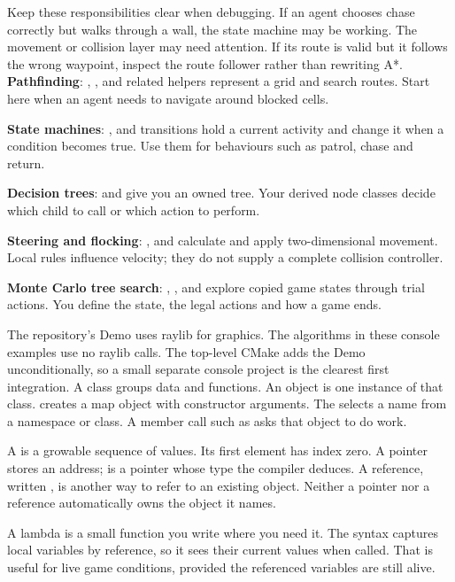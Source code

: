 \documentclass[11pt,a4paper]{article}
\begin{document}
Keep these responsibilities clear when debugging. If an agent chooses chase correctly but walks through a wall, the state machine may be working. The movement or collision layer may need attention. If its route is valid but it follows the wrong waypoint, inspect the route follower rather than rewriting A*.
\textbf{Pathfinding}: , ,  and related helpers represent a grid and search routes. Start here when an agent needs to navigate around blocked cells.

\textbf{State machines}: ,  and transitions hold a current activity and change it when a condition becomes true. Use them for behaviours such as patrol, chase and return.

\textbf{Decision trees}:  and  give you an owned tree. Your derived node classes decide which child to call or which action to perform.

\textbf{Steering and flocking}: ,  and  calculate and apply two-dimensional movement. Local rules influence velocity; they do not supply a complete collision controller.

\textbf{Monte Carlo tree search}: , ,  and  explore copied game states through trial actions. You define the state, the legal actions and how a game ends.

The repository's Demo uses raylib for graphics. The algorithms in these console examples use no raylib calls. The top-level CMake adds the Demo unconditionally, so a small separate console project is the clearest first integration.
A class groups data and functions. An object is one instance of that class.  creates a map object with constructor arguments. The \api{::} selects a name from a namespace or class. A member call such as  asks that object to do work.

A  is a growable sequence of values. Its first element has index zero. A pointer stores an address;  is a pointer whose type the compiler deduces. A reference, written , is another way to refer to an existing object. Neither a pointer nor a reference automatically owns the object it names.

A lambda is a small function you write where you need it. The syntax  captures local variables by reference, so it sees their current values when called. That is useful for live game conditions, provided the referenced variables are still alive.
\end{document}

